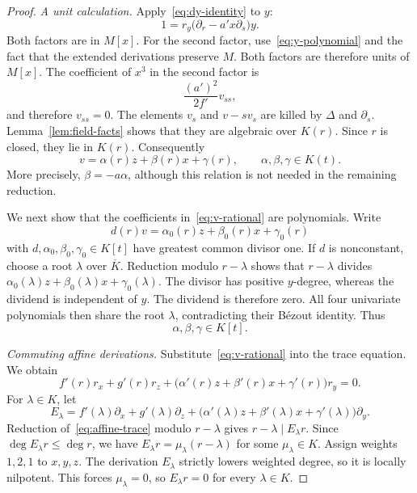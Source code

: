 \documentclass[11pt,reqno]{amsart}
\theoremstyle{definition}
\theoremstyle{remark}
\numberwithin{equation}{section}
\begin{document}
\begin{proof}
\smallskip\noindent\emph{A unit calculation.}
Apply~\eqref{eq:dy-identity} to $y$:
\begin{equation}\label{eq:unit-identity}
 1=r_y\bigl(\partial_r-a'x\partial_s\bigr)y.
\end{equation}
Both factors are in $M[x]$. For the second factor, use~\eqref{eq:y-polynomial} and the fact that the extended derivations preserve $M$. Both factors are therefore units of $M[x]$. The coefficient of $x^3$ in the second factor is
\[
 \frac{(a')^2}{2f'}v_{ss},
\]
and therefore $v_{ss}=0$. The elements $v_s$ and $v-sv_s$ are killed by $\Delta$ and $\partial_s$. Lemma~\ref{lem:field-facts} shows that they are algebraic over $K(r)$. Since $r$ is closed, they lie in $K(r)$. Consequently
\begin{equation}\label{eq:v-rational}
 v=\alpha(r)z+\beta(r)x+\gamma(r),\qquad \alpha,\beta,\gamma\in K(t).
\end{equation}
More precisely, $\beta=-a\alpha$, although this relation is not needed in the remaining reduction.

We next show that the coefficients in~\eqref{eq:v-rational} are polynomials. Write
\[
 d(r)v=\alpha_0(r)z+\beta_0(r)x+\gamma_0(r)
\]
with $d,\alpha_0,\beta_0,\gamma_0\in K[t]$ have greatest common divisor one. If $d$ is nonconstant, choose a root $\lambda$ over $\overline K$. Reduction modulo $r-\lambda$ shows that $r-\lambda$ divides
$\alpha_0(\lambda)z+\beta_0(\lambda)x+\gamma_0(\lambda)$. The divisor has positive $y$-degree, whereas the dividend is independent of $y$. The dividend is therefore zero. All four univariate polynomials then share the root $\lambda$, contradicting their B\'ezout identity. Thus
\begin{equation}\label{eq:v-polynomial}
 \alpha,\beta,\gamma\in K[t].
\end{equation}

\smallskip\noindent\emph{Commuting affine derivations.}
Substitute~\eqref{eq:v-rational} into the trace equation. We obtain
\begin{equation}\label{eq:affine-trace}
 f'(r)r_x+g'(r)r_z+
 \bigl(\alpha'(r)z+\beta'(r)x+\gamma'(r)\bigr)r_y=0.
\end{equation}
For $\lambda\in K$, let
\[
 E_\lambda=f'(\lambda)\partial_x+g'(\lambda)\partial_z+
 \bigl(\alpha'(\lambda)z+\beta'(\lambda)x+\gamma'(\lambda)\bigr)\partial_y.
\]
Reduction of~\eqref{eq:affine-trace} modulo $r-\lambda$ gives $r-\lambda\mid E_\lambda r$. Since $\deg E_\lambda r\leq\deg r$, we have $E_\lambda r=\mu_\lambda(r-\lambda)$ for some $\mu_\lambda\in K$. Assign weights $1,2,1$ to $x,y,z$. The derivation $E_\lambda$ strictly lowers weighted degree, so it is locally nilpotent. This forces $\mu_\lambda=0$, so $E_\lambda r=0$ for every $\lambda\in K$.


\end{proof}
\end{document}
